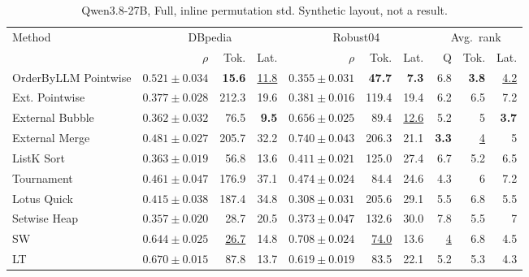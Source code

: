 \begin{table}[t]
\centering\footnotesize\setlength{\tabcolsep}{3.2pt}\renewcommand{\arraystretch}{1.12}
\caption{Qwen3.8-27B, Full, inline permutation std. Synthetic layout, not a result.}
\begin{tabular}{@{}lrrrrrrrrr@{}}
\toprule
Method & \multicolumn{3}{c}{DBpedia} & \multicolumn{3}{c}{Robust04} & \multicolumn{3}{c}{Avg.\ rank} \\
\cmidrule(lr){2-4} \cmidrule(lr){5-7} \cmidrule(lr){8-10}
 & $\rho$ & Tok. & Lat. & $\rho$ & Tok. & Lat. & Q & Tok. & Lat. \\
\midrule
OrderByLLM Pointwise & $0.521\pm0.034$ & \textbf{15.6} & \underline{11.8} & $0.355\pm0.031$ & \textbf{47.7} & \textbf{7.3} & 6.8 & \textbf{3.8} & \underline{4.2} \\
Ext. Pointwise & $0.377\pm0.028$ & 212.3 & 19.6 & $0.381\pm0.016$ & 119.4 & 19.4 & 6.2 & 6.5 & 7.2 \\
External Bubble & $0.362\pm0.032$ & 76.5 & \textbf{9.5} & $0.656\pm0.025$ & 89.4 & \underline{12.6} & 5.2 & 5 & \textbf{3.7} \\
External Merge & $0.481\pm0.027$ & 205.7 & 32.2 & \textbf{$0.740\pm0.043$} & 206.3 & 21.1 & \textbf{3.3} & \underline{4} & 5 \\
ListK Sort & $0.363\pm0.019$ & 56.8 & 13.6 & $0.411\pm0.021$ & 125.0 & 27.4 & 6.7 & 5.2 & 6.5 \\
Tournament & $0.461\pm0.047$ & 176.9 & 37.1 & $0.474\pm0.024$ & 84.4 & 24.6 & 4.3 & 6 & 7.2 \\
Lotus Quick & $0.415\pm0.038$ & 187.4 & 34.8 & $0.308\pm0.031$ & 205.6 & 29.1 & 5.5 & 6.8 & 5.5 \\
Setwise Heap & $0.357\pm0.020$ & 28.7 & 20.5 & $0.373\pm0.047$ & 132.6 & 30.0 & 7.8 & 5.5 & 7 \\
SW & \underline{$0.644\pm0.025$} & \underline{26.7} & 14.8 & \underline{$0.708\pm0.024$} & \underline{74.0} & 13.6 & \underline{4} & 6.8 & 4.5 \\
LT & \textbf{$0.670\pm0.015$} & 87.8 & 13.7 & $0.619\pm0.019$ & 83.5 & 22.1 & 5.2 & 5.3 & 4.3 \\
\bottomrule
\end{tabular}
\end{table}

